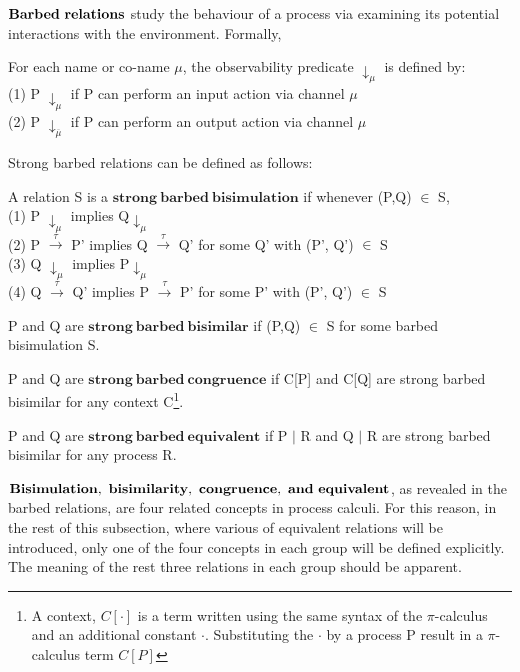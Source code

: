 $\bf{Barbed\ relations}$ study the behaviour of a process via examining its potential interactions with the environment.  Formally,

\begin{defn}
For each name or co-name $\mu$, the observability predicate $\downarrow_\mu$ is defined by:\\
    (1) P $\downarrow_\mu$ if P can perform an input action via channel $\mu$\\
    (2) P $\downarrow_\text{$\overline{\mu}$}$ if P can perform an output action via channel $\mu$
\end{defn}
 
Strong barbed relations can be defined as follows:

\begin{defn}
A relation S is a $\mathbf{strong\ barbed\ bisimulation}$ if whenever (P,Q) $\in$ S,\\
(1) P $\downarrow_\mu$ implies Q$\downarrow_\mu$\\
(2) P $\overset{\tau}{\longrightarrow}$ P' implies Q $\overset{\tau}{\longrightarrow}$ Q' for some Q' with (P', Q') $\in$ S \\
(3) Q $\downarrow_\mu$ implies P$\downarrow_\mu$\\
(4) Q $\overset{\tau}{\longrightarrow}$ Q' implies P $\overset{\tau}{\longrightarrow}$ P' for some P' with (P', Q') $\in$ S
\end{defn}

\begin{defn}
P and Q are $\mathbf{strong\ barbed\ bisimilar}$ if (P,Q) $\in$ S for some barbed bisimulation S.
\end{defn}

\begin{defn}
P and Q are $\mathbf{strong\ barbed\ congruence}$ if C[P] and C[Q] are strong barbed bisimilar for any context C\footnote{A context, $C[\cdot]$ is a term written using the same syntax of the $\pi$-calculus and an additional constant $\cdot$.  Substituting the $\cdot$ by a process P result in a $\pi$-calculus term $C[P]$ }.
\end{defn}

\begin{defn}
P and Q are $\mathbf{strong\ barbed\ equivalent}$ if P $|$ R and Q $|$ R are strong barbed bisimilar for any process R.
\end{defn}

$\bf{Bisimulation,\ bisimilarity,\ congruence,\ and\ equivalent}$, as revealed in the barbed relations, are four related concepts in process calculi.  For this reason, in the rest of this subsection, where various of equivalent relations will be introduced, only one of the four concepts in each group will be defined explicitly.  The meaning of the rest three relations in each group should be apparent. 

